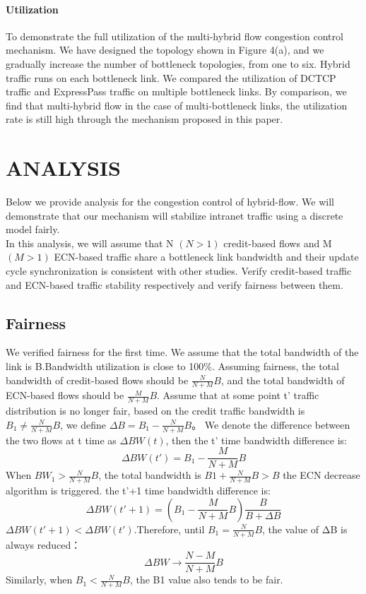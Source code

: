 \documentclass[conference]{IEEEtran}
\begin{document}
\paragraph{Utilization} To demonstrate the full utilization of the multi-hybrid flow congestion control mechanism. We have designed the topology shown in Figure 4(a), and we gradually increase the number of bottleneck topologies, from one to six. Hybrid traffic runs on each bottleneck link. We compared the utilization of DCTCP traffic and ExpressPass traffic on multiple bottleneck links. By comparison, we find that multi-hybrid flow in the case of multi-bottleneck links, the utilization rate is still high through the mechanism proposed in this paper.
\section{ANALYSIS}
Below we provide analysis for the congestion control of hybrid-flow. We will demonstrate that our mechanism will stabilize intranet traffic using a discrete model fairly.\\
\indent In this analysis, we will assume that N $(N>1)$ credit-based flows and M$(M>1)$ ECN-based traffic share a bottleneck link bandwidth and their update cycle synchronization is consistent with other studies. Verify credit-based traffic and ECN-based traffic stability respectively and verify fairness between them.
\subsection{Fairness}
We verified fairness for the first time. We assume that the total bandwidth of the link is B.Bandwidth utilization is close to 100\%. Assuming fairness, the total bandwidth of credit-based flows should be $\frac{N}{N + M}B$, and the
total bandwidth of ECN-based flows should be $\frac{M}{N + M}B$. Assume that at some point t' traffic distribution is no longer fair, based on the credit traffic bandwidth is $B_1\not=\frac{N}{N + M}B$, we define $\Delta B= B_1-\frac{N}{N + M}B$。
We denote the difference between the two flows at t time as $\Delta BW(t)$, then the t' time bandwidth difference is:
\begin{equation}
\Delta BW(t')=B_1-\frac{M}{N+M}B
\end{equation}
\indent When $BW_1>\frac{N}{N + M}B$, the total bandwidth is $B1+\frac{N}{N + M}B>B$ the ECN decrease algorithm is triggered. the t'+1 time bandwidth difference is:
\begin{equation}
\Delta BW(t'+1)=(B_1-\frac{M}{N+M}B)\frac{B}{B+\Delta B}
\end{equation}
\indent $\Delta BW(t'+1)<\Delta BW(t')$.Therefore, until $B_1=\frac{N}{N + M}B$, the value of ΔB is always reduced：
\begin{equation}
\Delta BW \to \frac{N-M}{N+M}B
\end{equation}
Similarly, when $B_1<\frac{N}{N + M}B$, the B1 value also tends to be fair.
\end{document}
